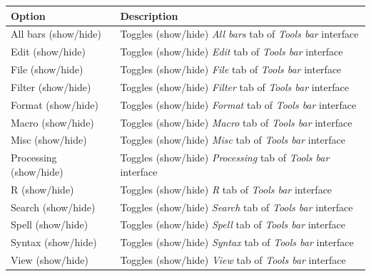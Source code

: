 \begin{scriptsize}
  \begin{tabularx}{\textwidth}{>{\hsize=0.3\hsize}X>{\hsize=0.7\hsize}X}\\
    \hline
    \textbf{Option} & \textbf{Description} \\
    \hline
    All bars (show/hide) & Toggles (show/hide) \textit{All bars} tab of \textit{Tools bar} interface \\
    \hdashline[1pt/1pt]
    Edit (show/hide) & Toggles (show/hide) \textit{Edit} tab of \textit{Tools bar} interface \\
    File (show/hide) & Toggles (show/hide) \textit{File} tab of \textit{Tools bar} interface \\
    Filter (show/hide) & Toggles (show/hide) \textit{Filter} tab of \textit{Tools bar} interface \\
    Format (show/hide) & Toggles (show/hide) \textit{Format} tab of \textit{Tools bar} interface \\
    Macro (show/hide) & Toggles (show/hide) \textit{Macro} tab of \textit{Tools bar} interface \\
    Misc (show/hide) & Toggles (show/hide) \textit{Misc} tab of \textit{Tools bar} interface \\
    Processing (show/hide) & Toggles (show/hide) \textit{Processing} tab of \textit{Tools bar} interface \\
    R (show/hide) & Toggles (show/hide) \textit{R} tab of \textit{Tools bar} interface \\
    Search (show/hide) & Toggles (show/hide) \textit{Search} tab of \textit{Tools bar} interface \\
    Spell (show/hide) & Toggles (show/hide) \textit{Spell} tab of \textit{Tools bar} interface \\
    Syntax (show/hide) & Toggles (show/hide) \textit{Syntax} tab of \textit{Tools bar} interface \\
    View (show/hide) & Toggles (show/hide) \textit{View} tab of \textit{Tools bar} interface \\
    \hline
  \end{tabularx}
\end{scriptsize}


